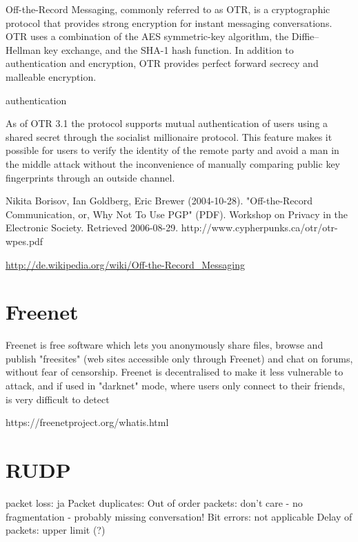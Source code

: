 Off-the-Record Messaging, commonly referred to as OTR, is a cryptographic protocol that provides strong encryption for instant messaging conversations. OTR uses a combination of the AES symmetric-key algorithm, the Diffie–Hellman key exchange, and the SHA-1 hash function. In addition to authentication and encryption, OTR provides perfect forward secrecy and malleable encryption.

authentication

As of OTR 3.1 the protocol supports mutual authentication of users using a shared secret through the socialist millionaire protocol. This feature makes it possible for users to verify the identity of the remote party and avoid a man in the middle attack without the inconvenience of manually comparing public key fingerprints through an outside channel. 



 Nikita Borisov, Ian Goldberg, Eric Brewer (2004-10-28). "Off-the-Record Communication, or, Why Not To Use PGP" (PDF). Workshop on Privacy in the Electronic Society. Retrieved 2006-08-29.
 http://www.cypherpunks.ca/otr/otr-wpes.pdf
 
\cite{otr}


\url{http://de.wikipedia.org/wiki/Off-the-Record_Messaging}
\section{Freenet}

Freenet is free software which lets you anonymously share files, browse and publish "freesites" (web sites accessible only through Freenet) and chat on forums, without fear of censorship. Freenet is decentralised to make it less vulnerable to attack, and if used in "darknet" mode, where users only connect to their friends, is very difficult to detect

https://freenetproject.org/whatis.html

\cite{freenet}

\section{RUDP}

packet loss: ja
Packet duplicates:
Out of order packets: don't care - no fragmentation
    - probably missing conversation!
    Bit errors: not applicable
    Delay of packets: upper limit (?) 


